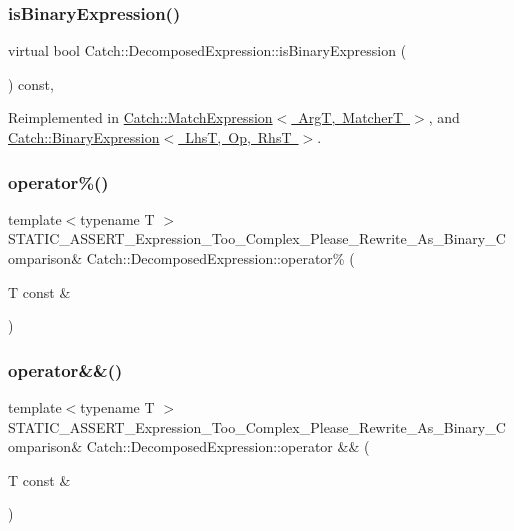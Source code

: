 \subsubsection{\texorpdfstring{is\+Binary\+Expression()}{isBinaryExpression()}}
{\footnotesize\ttfamily virtual bool Catch\+::\+Decomposed\+Expression\+::is\+Binary\+Expression (\begin{DoxyParamCaption}{ }\end{DoxyParamCaption}) const\hspace{0.3cm}{\ttfamily [inline]}, {\ttfamily [virtual]}}



Reimplemented in \mbox{\hyperlink{class_catch_1_1_match_expression_ac4edf6e9a6e5762a487db1486d0d1f45}{Catch\+::\+Match\+Expression$<$ Arg\+T, Matcher\+T $>$}}, and \mbox{\hyperlink{class_catch_1_1_binary_expression_a4c617c0b6a73a9cafbbf900909c7c258}{Catch\+::\+Binary\+Expression$<$ Lhs\+T, Op, Rhs\+T $>$}}.

\mbox{\label{struct_catch_1_1_decomposed_expression_a6584335aadaee847c9d06ca8f13a4477}} 
\subsubsection{\texorpdfstring{operator\%()}{operator\%()}}
{\footnotesize\ttfamily template$<$typename T $>$ \\
S\+T\+A\+T\+I\+C\+\_\+\+A\+S\+S\+E\+R\+T\+\_\+\+Expression\+\_\+\+Too\+\_\+\+Complex\+\_\+\+Please\+\_\+\+Rewrite\+\_\+\+As\+\_\+\+Binary\+\_\+\+Comparison\& Catch\+::\+Decomposed\+Expression\+::operator\% (\begin{DoxyParamCaption}\item[{T const \&}]{ }\end{DoxyParamCaption})}

\mbox{\label{struct_catch_1_1_decomposed_expression_a14d913535796145b39101a16c0c490da}} 
\subsubsection{\texorpdfstring{operator\&\&()}{operator\&\&()}}
{\footnotesize\ttfamily template$<$typename T $>$ \\
S\+T\+A\+T\+I\+C\+\_\+\+A\+S\+S\+E\+R\+T\+\_\+\+Expression\+\_\+\+Too\+\_\+\+Complex\+\_\+\+Please\+\_\+\+Rewrite\+\_\+\+As\+\_\+\+Binary\+\_\+\+Comparison\& Catch\+::\+Decomposed\+Expression\+::operator \&\& (\begin{DoxyParamCaption}\item[{T const \&}]{ }\end{DoxyParamCaption})}

